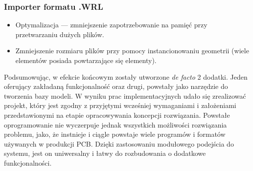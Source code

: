 \documentclass[brudnopis]{xmgr}
\begin{document}
\subsubsection{Importer formatu .WRL}
\begin{itemize}
\item Optymalizacja --- zmniejszenie zapotrzebowanie na pamięć przy przetwarzaniu dużych plików.
\item Zmniejszenie rozmiaru plików przy pomocy instancionowaniu geometrii (wiele elementów posiada powtarzające się elementy).
\end{itemize}

\summary
Podsumowując, w efekcie końcowym zostały utworzone \emph{de facto} 2 dodatki. Jeden oferujący zakładaną funkcjonalność oraz drugi, powstały jako narzędzie do tworzenia bazy modeli. W wyniku prac implementacyjnych udało się zrealizować projekt, który jest zgodny z przyjętymi wcześniej wymaganiami i założeniami przedstawionymi na etapie opracowywania koncepcji rozwiązania. Powstałe oprogramowanie nie wyczerpuje jednak wszystkich możliwości rozwiązania problemu, jako, że instnieje i ciągle powstaje wiele programów i formatów używanych w produkcji PCB. Dzięki zastosowaniu modułowego podejścia do systemu, jest on uniwersalny i łatwy do rozbudowania o dodatkowe funkcjonalności.





\listoftables

\listoffigures

\oswiadczenie
\end{document}
